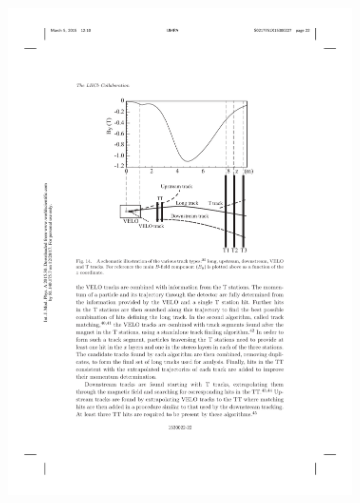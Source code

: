 \begin{figure}[!h]
    \centering
    \begin{subfigure}[t]{0.4\textwidth}
        \centering
        \includegraphics[width=1.0\textwidth]{figs/Detector/reco_track_types.pdf}
    \end{subfigure}
    \begin{subfigure}[t]{0.4\textwidth}
        \centering

\end{subfigure}
\end{figure}
